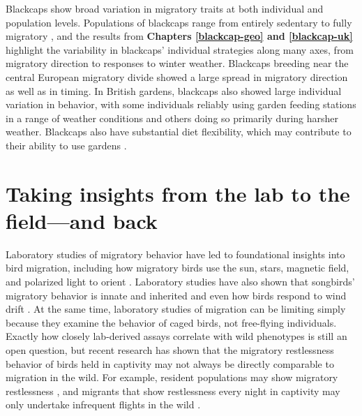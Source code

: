 \documentclass[a4paper, nobind]{templates/ociamthesis}
\begin{document}
Blackcaps show broad variation in migratory traits at both individual and population levels. Populations of blackcaps range from entirely sedentary to fully migratory \autocite{crampSylviaAtricapillaBlackcap1992}, and the results from \textbf{Chapters \ref{blackcap-geo} and \ref{blackcap-uk}} highlight the variability in blackcaps' individual strategies along many axes, from migratory direction to responses to winter weather. Blackcaps breeding near the central European migratory divide showed a large spread in migratory direction as well as in timing. In British gardens, blackcaps also showed large individual variation in behavior, with some individuals reliably using garden feeding stations in a range of weather conditions and others doing so primarily during harsher weather. Blackcaps also have substantial diet flexibility, which may contribute to their ability to use gardens \autocite{hardyWinterFoodsBlackcaps1978,reyDietPlasticityBlackcap1999}.

\hypertarget{taking-insights-from-the-lab-to-the-fieldand-back}{%
\section*{Taking insights from the lab to the field---and back}\label{taking-insights-from-the-lab-to-the-fieldand-back}}

Laboratory studies of migratory behavior have led to foundational insights into bird migration, including how migratory birds use the sun, stars, magnetic field, and polarized light to orient \autocite{emlenMigratoryOrientationIndigo1967,wiltschkoEvidenceInnateMagnetic1974,alerstamRoleGeomagneticField1983,akessonHowMigrantsGet2007}. Laboratory studies have also shown that songbirds' migratory behavior is innate and inherited \autocite{bertholdGeneticControlMigratory1991,helbigInheritanceMigratoryDirection1991} and even how birds respond to wind drift \autocite{ableOrientationPasserineNocturnal1977,mooreEvidenceRedeterminationMigratory1990}. At the same time, laboratory studies of migration can be limiting simply because they examine the behavior of caged birds, not free-flying individuals. Exactly how closely lab-derived assays correlate with wild phenotypes is still an open question, but recent research has shown that the migratory restlessness behavior of birds held in captivity may not always be directly comparable to migration in the wild. For example, resident populations may show migratory restlessness \autocite{helmMigratoryRestlessnessEquatorial2006}, and migrants that show restlessness every night in captivity may only undertake infrequent flights in the wild \autocite{zunigaAbruptSwitchMigratory2016,backmanActivityMigratoryFlights2017}.
\end{document}
